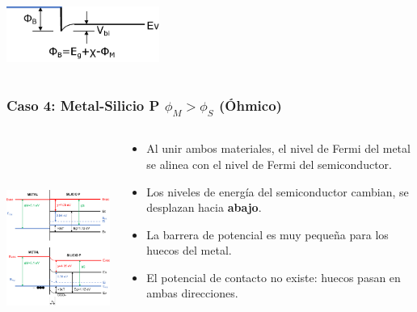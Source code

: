 \documentclass[10pt,t,aspectratio=169]{beamer}
\begin{document}
\begin{frame}[t]
\begin{columns}
\begin{column}{0.5\textwidth}
            \vspace{5mm}
            \centering
            \includegraphics[width=5cm]{./figures/contactos-caso3b.pdf}
            
        \end{column}
        
    \end{columns}
    
\end{frame}


\begin{frame}[t]
    \frametitle{Caso 4:	Metal-Silicio P \hspace{1cm} $\phi_M>\phi_S$ \hspace{1cm} (Óhmico)}

    \begin{columns}
    
        \begin{column}{0.5\textwidth}
        
            \centering
            \includegraphics[height=7cm]{./figures/contactos-caso4.pdf}
            
        \end{column}
        
        \begin{column}{0.5\textwidth}
        
            \begin{itemize}
                \item Al unir ambos materiales, el nivel de Fermi del metal se alinea con el nivel de Fermi del semiconductor.
                \item Los niveles de energía del semiconductor cambian, se desplazan hacia \textbf{abajo}.
                \item La barrera de potencial es muy pequeña para los huecos del metal.
                \item El potencial de contacto no existe: huecos pasan en ambas direcciones.
            \end{itemize}


\end{column}
\end{columns}
\end{frame}
\end{document}

